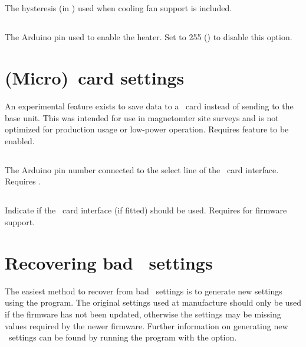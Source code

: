 \subsection[fan-temperature-hysteresis]{}
The hysteresis (in \degC{}) used when cooling fan support is included.

\subsection[heater-pin]{}
The Arduino pin used to enable the heater. Set to 255 () to
disable this option.

\section[(Micro)SD card settings]{(Micro)\sd\ card settings}

An experimental feature exists to save data to a \sd\ card instead of
sending to the base unit. This was intended for use in magnetomter
site surveys and is not optimized for production usage or low-power
operation. Requires  feature to be enabled.



\subsection[sd-select]{}

The Arduino pin number connected to the select line of the \sd\ card interface.
Requires .

\subsection[use-sd]{}

Indicate if the \sd\ card interface (if fitted) should be used. Requires
 for firmware support.



\section[Recovering bad EEPROM settings]{%
  Recovering bad \eeprom\ settings}
\label{sec:bad-eeprom-settings}

The easiest method to recover from bad \eeprom\ settings is to generate new
settings using the  program. The original
settings used at manufacture should only be used if the firmware has not been
updated, otherwise the settings may be missing values required by the newer
firmware. Further information on generating new \eeprom\ settings can be found
by running the  program with the 
option.

